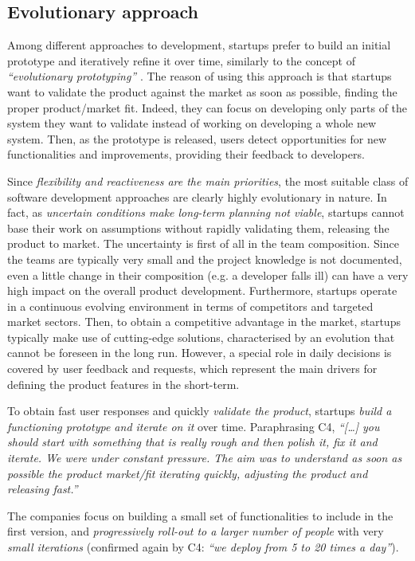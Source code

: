 \documentclass[10pt,journal,letterpaper,compsoc]{IEEEtran}
\begin{document}
\subsection{Evolutionary approach}\label{res:gsm:cat2} 
Among different approaches to development, startups prefer to build an initial  
prototype and iteratively refine it over time, similarly to the concept of
\textit{``evolutionary prototyping''} \cite{EvProt}. The reason of using this
approach is that startups want to validate the product against the market as
soon as possible, finding the proper product/market fit. Indeed, they can focus
on developing only parts of the system they want to validate instead of working
on developing a whole new system. Then, as the prototype is released, users
detect opportunities for new functionalities and improvements, providing their
feedback to developers.


Since \textit{flexibility and reactiveness are the main priorities}, the most
suitable class of software development approaches are clearly highly
evolutionary in nature. In fact, as \textit{uncertain conditions make long-term
planning not viable}, startups cannot base their work on assumptions without
rapidly validating them, releasing the product to market. The uncertainty is
first of all in the team composition. Since the teams are typically very small
and the project knowledge is not documented, even a little change in their
composition (e.g. a developer falls ill) can have a very high impact on the
overall product development. Furthermore, startups operate in a continuous
evolving environment in terms of competitors and targeted market sectors. Then,
to obtain a competitive advantage in the market, startups typically make use of
cutting-edge solutions, characterised by an evolution that cannot be foreseen in
the long run. However, a special role in daily decisions is covered by user
feedback and requests, which represent the main drivers for defining the product
features in the short-term.

To obtain fast user responses and quickly \textit{validate the product},
startups \textit{build a functioning prototype and iterate on it} over time.
Paraphrasing C4, \textit{``[\ldots] you should start with something that is
really rough and then polish it, fix it and iterate. We were under constant
pressure. The aim was to understand as soon as possible the product market/fit
iterating quickly, adjusting the product and releasing fast.''}

The companies focus on building a small set of functionalities to include in
the first version, and \textit{progressively roll-out to a larger number of
people} with very \textit{small iterations} (confirmed again by C4: \textit{``we
deploy from 5 to 20 times a day''}).
\end{document}

